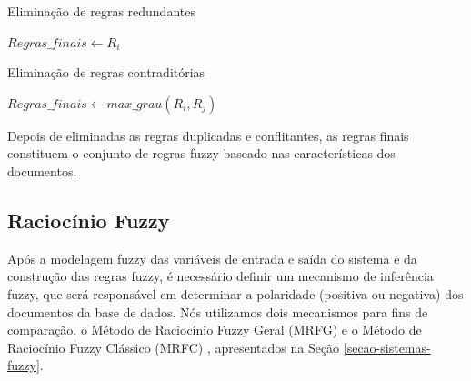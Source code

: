 \documentclass[template.tex]{subfiles}
\begin{document}
\begin{algorithm}
\begin{algorithmic}[1]
\caption{Eliminação de regras redundantes}
\label{alg-regras-repetidas}
           \STATE $Regras\_finais \leftarrow R_i$
       \ENDIF    
   \ENDFOR
\ENDFOR
\end{algorithmic}
\end{algorithm}

\begin{algorithm}
\begin{algorithmic}[1]
\caption{Eliminação de regras contraditórias}
\label{alg-regras-contraditorias}
           \STATE $Regras\_finais \leftarrow max\_grau(R_i,R_j)$
       \ENDIF    
   \ENDFOR
\ENDFOR
\end{algorithmic}
\end{algorithm}


%

Depois de eliminadas as regras duplicadas e conflitantes, as regras finais constituem o conjunto de regras fuzzy baseado nas características dos documentos.

\subsection{Raciocínio Fuzzy}

Após a modelagem fuzzy das variáveis de entrada e saída do sistema e da construção das regras fuzzy, é necessário definir um mecanismo de inferência fuzzy, que será responsável em determinar a polaridade (positiva ou negativa) dos documentos da base de dados. Nós utilizamos dois mecanismos para fins de comparação, o Método de Raciocínio Fuzzy Geral (MRFG) e o Método de Raciocínio Fuzzy Clássico (MRFC) \cite{cordon1999proposal}, apresentados na Seção \ref{secao-sistemas-fuzzy}.
\end{document}
